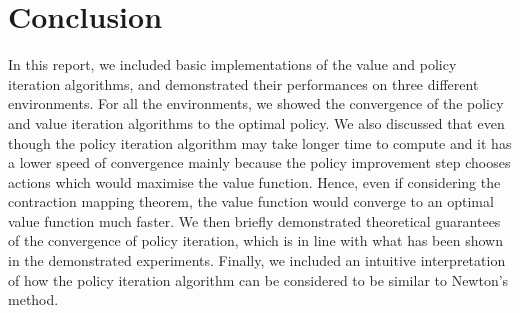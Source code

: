 \documentclass{article}\usepackage[]{graphicx}\usepackage[]{color}
\let\Oldsection\section
\renewcommand{\section}{\FloatBarrier\Oldsection}
\theoremstyle{plain}
\begin{document}
\section{Conclusion}

\noindent
In this report, we included basic implementations of the value and policy iteration algorithms, and demonstrated their performances on three different environments. For all the environments, we showed the convergence of the policy and value iteration algorithms to the optimal policy. We also discussed that even though the policy iteration algorithm may take longer time to compute and it has a lower speed of convergence mainly because the policy improvement step chooses actions which would maximise the value function. Hence, even if considering the contraction mapping theorem, the value function would converge to an optimal value function much faster. We then briefly demonstrated theoretical guarantees of the convergence of policy iteration, which is in line with what has been shown in the demonstrated experiments. Finally, we included an intuitive interpretation of how the policy iteration algorithm can be considered to be similar to Newton's method. 
\end{document}
